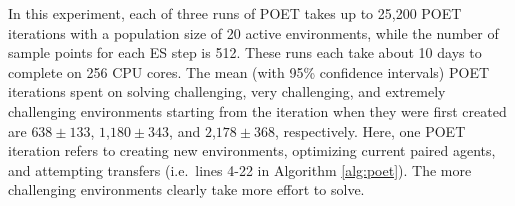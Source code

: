 \documentclass{article}
\newcommand{\jc}[1]{\comments{\textcolor{deepForestGreen}{[JC: #1]}}}
\newcommand{\ks}[1]{\comments{\textcolor{purple}{[Ken: #1]}}}
\newcommand{\rw}[1]{\comments{\textcolor{blue}{[Rui: #1]}}}
\newcommand{\comments}[1]{#1}
\begin{document}
In this experiment, each of three runs of POET takes up to 25,200 POET iterations with a population size of 20 active environments, while the number of sample points for each ES step is 512.
These runs each take about 10 days to complete on 256 CPU cores.
The mean (with 95\% confidence intervals) POET iterations spent on solving challenging, very challenging, and extremely challenging environments starting from the iteration when they were first created are $638\pm133$, $1$,$180\pm343$, and $2$,$178\pm368$, respectively.
Here, one POET iteration refers to 
creating new environments, optimizing current paired agents, and attempting transfers (i.e.\ lines 4-22 in Algorithm \ref{alg:poet}). 
The more challenging environments clearly take more effort to solve.
\end{document}

